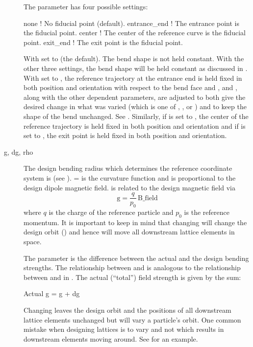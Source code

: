\begin{description}
The  parameter
has four possible settings:
\begin{example}
  none          ! No fiducial point (default).
  entrance_end  ! The entrance point is the fiducial point.
  center        ! The center of the reference curve is the fiducial point.
  exit_end      ! The exit point is the fiducial point.
\end{example}
With  set to  (the default). The bend shape is not held constant. With the
other three settings, the bend shape will be held constant as discussed in .
With  set to , the reference trajectory at the entrance end is held
fixed in both position and orientation with respect to the bend face and ,  and ,
along with the other dependent parameters, are adjusted to both give the desired change in what was
varied (which is one of , ,  or ) and to keep the shape of the
bend unchanged. See . Similarly, if  is set to , the
center of the reference trajectory is held fixed in both position and orientation and if
 is set to , the exit point is held fixed in both position and
orientation.
  \item[g, dg, rho] \Newline
The design bending radius which determines the reference coordinate system is  (see
).  =  is the curvature function and is proportional to the design
dipole magnetic field.  is related to the design magnetic field  via
\begin{equation}
  \text{g} = \frac{q}{p_0} \, \text{B_field} 
  \label{gqpb}
\end{equation}
where $q$ is the charge of the reference particle and $p_0$ is the reference momentum. It is
important to keep in mind that changing  will change the design orbit () and
hence will move all downstream lattice elements in space.

The parameter  is the difference between the actual and the design bending strengths. The
relationship between  and  is analogous to the relationship between  and
 in . The actual (``total'') field strength is given by the sum:
\begin{example}
  Actual g = g + dg
\end{example}
Changing  leaves the design orbit and the positions of all downstream lattice elements
unchanged but will vary a particle's orbit. One common mistake when designing lattices is to vary
 and not  which results in downstream elements moving around. See 
for an example.


\end{description}
